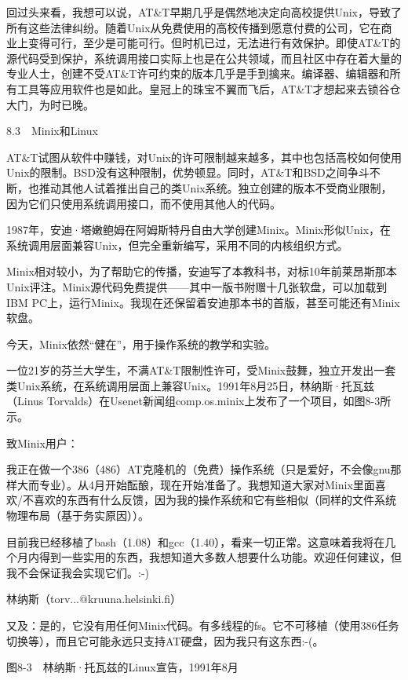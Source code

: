 \documentclass[a4paper,12pt,UTF8,twoside]{ctexbook}
\begin{document}
回过头来看，我想可以说，AT\&T早期几乎是偶然地决定向高校提供Unix，导致了所有这些法律纠纷。随着Unix从免费使用的高校传播到愿意付费的公司，它在商业上变得可行，至少是可能可行。但时机已过，无法进行有效保护。即使AT\&T的源代码受到保护，系统调用接口实际上也是在公共领域，而且社区中存在着大量的专业人士，创建不受AT\&T许可约束的版本几乎是手到擒来。编译器、编辑器和所有工具等应用软件也是如此。皇冠上的珠宝不翼而飞后，AT\&T才想起来去锁谷仓大门，为时已晚。





8.3　Minix和Linux


AT\&T试图从软件中赚钱，对Unix的许可限制越来越多，其中也包括高校如何使用Unix的限制。BSD没有这种限制，优势顿显。同时，AT\&T和BSD之间争斗不断，也推动其他人试着推出自己的类Unix系统。独立创建的版本不受商业限制，因为它们只使用系统调用接口，而不使用其他人的代码。

1987年，安迪·塔嫩鲍姆在阿姆斯特丹自由大学创建Minix。Minix形似Unix，在系统调用层面兼容Unix，但完全重新编写，采用不同的内核组织方式。

Minix相对较小，为了帮助它的传播，安迪写了本教科书，对标10年前莱昂斯那本Unix评注。Minix源代码免费提供——其中一版书附赠十几张软盘，可以加载到IBM PC上，运行Minix。我现在还保留着安迪那本书的首版，甚至可能还有Minix软盘。

今天，Minix依然“健在”，用于操作系统的教学和实验。

一位21岁的芬兰大学生，不满AT\&T限制性许可，受Minix鼓舞，独立开发出一套类Unix系统，在系统调用层面上兼容Unix。1991年8月25日，林纳斯·托瓦兹（Linus Torvalds）在Usenet新闻组comp.os.minix上发布了一个项目，如图8-3所示。



致Minix用户：

我正在做一个386（486）AT克隆机的（免费）操作系统（只是爱好，不会像gnu那样大而专业）。从4月开始酝酿，现在开始准备了。我想知道大家对Minix里面喜欢/不喜欢的东西有什么反馈，因为我的操作系统和它有些相似（同样的文件系统物理布局（基于务实原因））。

目前我已经移植了bash（1.08）和gcc（1.40），看来一切正常。这意味着我将在几个月内得到一些实用的东西，我想知道大多数人想要什么功能。欢迎任何建议，但我不会保证我会实现它们。:-)

林纳斯（torv...@kruuna.helsinki.fi）

又及：是的，它没有用任何Minix代码。有多线程的fs。它不可移植（使用386任务切换等），而且它可能永远只支持AT硬盘，因为我只有这东西:-(。



图8-3　林纳斯·托瓦兹的Linux宣告，1991年8月
\end{document}
